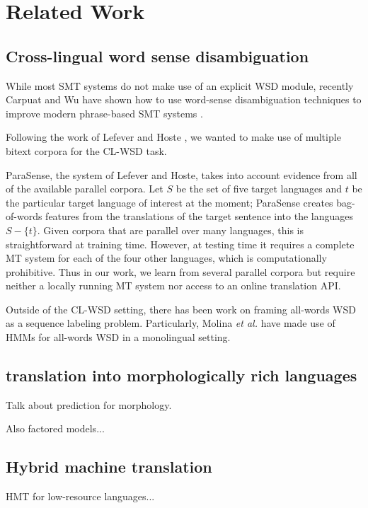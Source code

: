 \section{Related Work}

\subsection{Cross-lingual word sense disambiguation}

While most SMT systems do not make use of an explicit WSD module,
recently Carpuat and Wu have shown how to use word-sense
disambiguation techniques to improve modern phrase-based SMT systems
\cite{carpuatpsd}.
\cite{carpuat2008evaluation}
\cite{carpuat-wu:2007:EMNLP-CoNLL2007}

Following the work of Lefever and Hoste
, we wanted to make use of
multiple bitext corpora for the CL-WSD task.

ParaSense, the system of Lefever
and Hoste, takes into account evidence from all of the available parallel
corpora. Let $S$ be the set of five target languages and $t$ be the particular
target language of interest at the moment; ParaSense creates bag-of-words
features from the translations of the target sentence into the languages $S -
\lbrace{t \rbrace}$.
Given corpora that are parallel over many languages, this is straightforward at
training time. However, at testing time it requires a complete MT system for
each of the four other languages, which is computationally prohibitive. Thus in
our work, we learn from several parallel corpora but require neither a locally
running MT system nor access to an online translation API.


Outside of the CL-WSD setting, there has been work on framing all-words WSD as
a sequence labeling problem. Particularly, Molina \textit{et al.}
 have made use of HMMs for all-words
WSD in a monolingual setting.



\subsection{translation into morphologically rich languages}

Talk about prediction for morphology.
\cite{toutanova-suzuki-ruopp:2008:ACLMain}

Also factored models...

\subsection{Hybrid machine translation}
HMT for low-resource languages...

